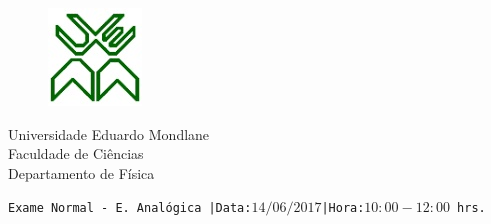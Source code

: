\documentclass[11pt,a4paper,twoside]{report}
\author{Bartolomeu J. Ubisse}
\begin{document}
\begin{figure}[htb]

\centering
\includegraphics[scale=1]{UEM-logotipo}
\end{figure}
\centering
{ \Large Universidade Eduardo Mondlane}\\[0.3cm] 
\large Faculdade de Ci\^encias\\[0.2cm]
 \large Departamento de F\'isica\\[0.5cm]

\begin{flushleft}
\tt Exame Normal - E. Anal\'ogica\hspace{0.25cm} |Data:$14/06/2017$\hspace{0.25cm}|Hora:$10:00-12:00$ hrs.\\
\hrulefill
\end{flushleft}
\end{document}
